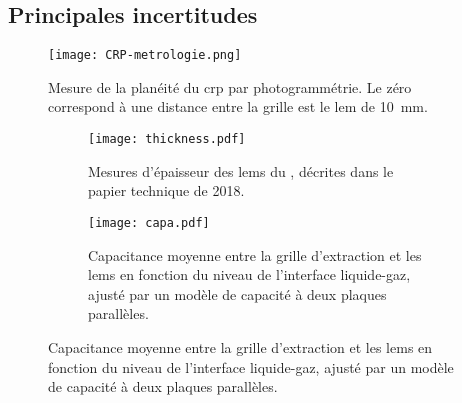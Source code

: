     \subsection{Principales incertitudes}\label{sec::uncertainties}
        
      \begin{figure}[htbp]
        \centering
        \texttt{[image: CRP-metrologie.png]}
        \caption[Mesure de la planéité du \gls{crp}.]{\label{fig::crp_var}Mesure de la planéité du \gls{crp} par photogrammétrie. Le zéro correspond à une distance entre la grille est le \gls{lem} de \SI{10}{\milli\meter}.}
      \end{figure}

      \begin{figure}[htbp]
        \centering
        \begin{subfigure}[t]{0.48\textwidth}
          \centering
          \texttt{[image: thickness.pdf]}
          \caption[Mesures d'épaisseur des \glspl{lem} du \TOO{}.]{\label{fig::lem_thicnkess_311}Mesures d'épaisseur des \glspl{lem} du \TOO{}, décrites dans le papier technique de 2018\cite{Aimard2018}.}
        \end{subfigure}\hfill
        \begin{subfigure}[t]{0.48\textwidth}
          \centering
          \texttt{[image: capa.pdf]}
          \caption[Capacitance moyenne entre la grille d'extraction et les \glspl{lem} en fonction du niveau de l'interface liquide-gaz.]{\label{fig::capa}Capacitance moyenne entre la grille d'extraction et les \glspl{lem} en fonction du niveau de l'interface liquide-gaz, ajusté par un modèle de capacité à deux plaques parallèles.}
        \end{subfigure}
      \end{figure}


